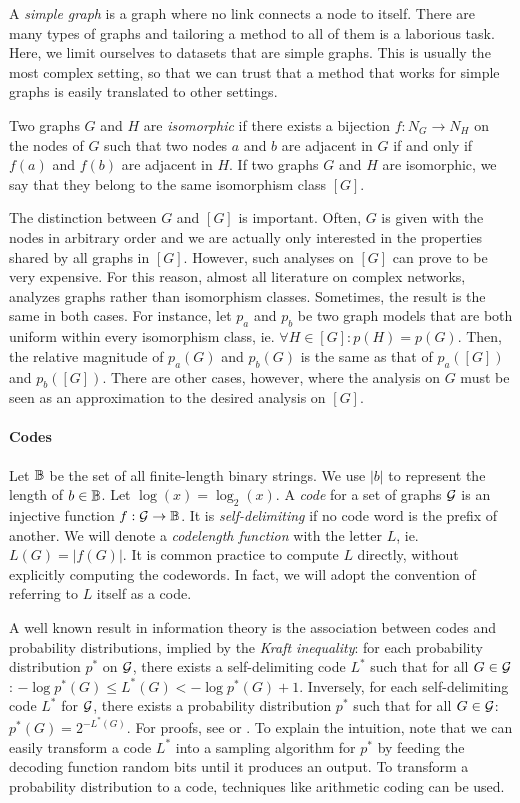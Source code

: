 A \emph{simple graph} is a graph where no link connects a node to itself. There are many types of graphs and tailoring a method to all of them is a laborious task. Here, we limit ourselves to datasets that are simple graphs. This is usually the most complex setting, so that we can trust that a method that works for simple graphs is easily translated to other settings.

Two graphs $G$ and $H$ are \emph{isomorphic} if there exists a bijection $f: N_G \to N_H$ on the nodes of $G$ such that two nodes $a$ and $b$ are adjacent in $G$ if and only if $f(a)$ and $f(b)$ are adjacent in $H$. If two graphs $G$ and $H$ are isomorphic, we say that they belong to the same isomorphism class $[G]$.

The distinction between $G$ and $[G]$ is important. Often, $G$ is given with the nodes in arbitrary order and we are actually only interested in the properties shared by all graphs in $[G]$. However, such analyses on $[G]$ can prove to be very expensive. For this reason, almost all literature on complex networks, analyzes graphs rather than isomorphism classes. Sometimes, the result is the same in both cases. For instance, let $p_a$ and $p_b$ be two graph models that are both uniform within every isomorphism class, ie. $\forall H \in [G]: p(H) = p(G)$. Then, the relative magnitude of $p_a(G)$ and $p_b(G)$ is the same as that of $p_a([G])$ and $p_b([G])$. There are other cases, however, where the analysis on $G$ must be seen as an approximation to the desired analysis on $[G]$.

\paragraph{Codes} Let ${\mathbb B}$ be the set of all finite-length binary strings. We use $|b|$ to represent the length of $b \in {\mathbb B}$. Let $\log(x) = \log_2(x)$. A \emph{code} for a set of graphs ${\mathcal G}$ is an injective function $f: \cal G \to {\mathbb B}$. It is \emph{self-delimiting} if no code word is the prefix of another. We will denote a \emph{codelength function} with the letter $L$, ie. $L(G) = |f(G)|$. It is common practice to compute $L$ directly, without explicitly computing the codewords. In fact, we will adopt the convention of referring to $L$ itself as a code.

A well known result in information theory is the association between codes and probability distributions, implied by the  \emph{Kraft inequality}: for each probability distribution $p^*$ on $\cal G$, there exists a self-delimiting code $L^*$ such that for all $G \in \cal G$: $- \log p^*(G) \leq L^*(G) < -\log p^*(G) + 1$. Inversely, for each self-delimiting code $L^*$ for $\cal G$, there exists a probability distribution $p^*$ such that for all $G \in \cal G$: $p^*(G) = 2^{-L^*(G)}$. For proofs, see \cite[Section~3.2.1]{grunwald2007minimum} or \cite[Theorem~5.2.1]{cover2006elements}. To explain the intuition, note that we can easily transform a code $L^*$ into a sampling algorithm for $p^*$ by feeding the decoding function random bits until it produces an output. To transform a probability distribution to a code, techniques like arithmetic coding \cite{rissanen1979arithmetic} can be used. 

